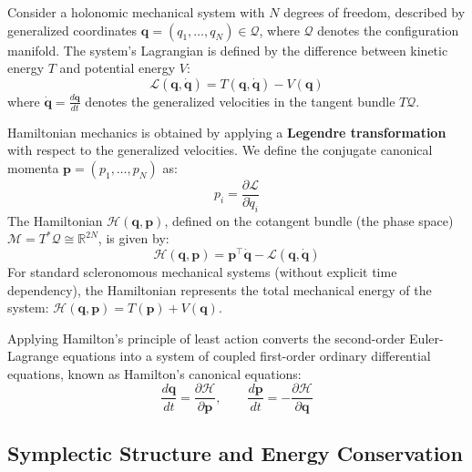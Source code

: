 \documentclass[11pt]{article}
\begin{document}
Consider a holonomic mechanical system with $N$ degrees of freedom, described by generalized coordinates $\mathbf{q} = (q_1, \dots, q_N) \in \mathcal{Q}$, where $\mathcal{Q}$ denotes the configuration manifold. The system's Lagrangian is defined by the difference between kinetic energy $T$ and potential energy $V$:
\begin{equation}
    \mathcal{L}(\mathbf{q}, \dot{\mathbf{q}}) = T(\mathbf{q}, \dot{\mathbf{q}}) - V(\mathbf{q})
\end{equation}
where $\dot{\mathbf{q}} = \frac{d\mathbf{q}}{dt}$ denotes the generalized velocities in the tangent bundle $T\mathcal{Q}$.

Hamiltonian mechanics is obtained by applying a \textbf{Legendre transformation} with respect to the generalized velocities. We define the conjugate canonical momenta $\mathbf{p} = (p_1, \dots, p_N)$ as:
\begin{equation}
    p_i = \frac{\partial \mathcal{L}}{\partial \dot{q}_i}
\end{equation}
The Hamiltonian $\mathcal{H}(\mathbf{q}, \mathbf{p})$, defined on the cotangent bundle (the phase space) $\mathcal{M} = T^*\mathcal{Q} \cong \mathbb{R}^{2N}$, is given by:
\begin{equation}
    \mathcal{H}(\mathbf{q}, \mathbf{p}) = \mathbf{p}^\top \dot{\mathbf{q}} - \mathcal{L}(\mathbf{q}, \dot{\mathbf{q}})
\end{equation}
For standard scleronomous mechanical systems (without explicit time dependency), the Hamiltonian represents the total mechanical energy of the system: $\mathcal{H}(\mathbf{q}, \mathbf{p}) = T(\mathbf{p}) + V(\mathbf{q})$.

Applying Hamilton's principle of least action converts the second-order Euler-Lagrange equations into a system of coupled first-order ordinary differential equations, known as Hamilton's canonical equations:
\begin{equation}
\label{eq:canonical_hamilton}
    \frac{d\mathbf{q}}{dt} = \frac{\partial \mathcal{H}}{\partial \mathbf{p}}, \qquad \frac{d\mathbf{p}}{dt} = -\frac{\partial \mathcal{H}}{\partial \mathbf{q}}
\end{equation}

\subsection{Symplectic Structure and Energy Conservation}
\end{document}
